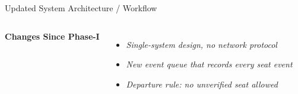 \documentclass[aspectratio=169,11pt]{beamer}
\newcommand{\smallnote}[1]{%
\vspace{0.08cm}
{\scriptsize\color{GEUGrey}#1}
}
\newcommand{\placeholder}[1]{%
\textit{\color{GEUGrey}#1}
}
\begin{document}
\begin{frame}{Updated System Architecture / Workflow}
\begin{columns}[T,totalwidth=\textwidth]
\textbf{\color{GEUBlue}Changes Since Phase-I}

\begin{itemize}\itemsep2pt
\item \placeholder{Single-system design, no network protocol}
\item \placeholder{New event queue that records every seat event}
\item \placeholder{Departure rule: no unverified seat allowed}
\end{itemize}

\end{columns}

\vfill


\end{frame}
\end{document}
